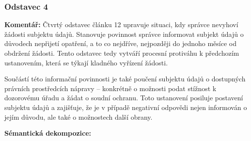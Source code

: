 
\subsubsection{Odstavec 4}
\label{sec:odstavec-4}
\begin{displayquote}  \cite{clanek12}
\end{displayquote}

\noindent \textbf{Komentář:}
Čtvrtý odstavec článku 12 upravuje situaci, kdy správce nevyhoví žádosti subjektu údajů. Stanovuje povinnost správce informovat subjekt údajů o důvodech nepřijetí opatření, a to co nejdříve, nejpozději do jednoho měsíce od obdržení žádosti. Tento odstavec tedy vytváří procesní protiváhu k předchozím ustanovením, která se týkají kladného vyřízení žádosti.

Součástí této informační povinnosti je také poučení subjektu údajů o dostupných právních prostředcích nápravy – konkrétně o možnosti podat stížnost k dozorovému úřadu a žádat o soudní ochranu. Toto ustanovení posiluje postavení subjektu údajů a zajišťuje, že je v případě negativní odpovědi nejen informován o jejím důvodu, ale také o možnostech další obrany.

\vspace{1em}

\noindent \textbf{Sémantická dekompozice:}

